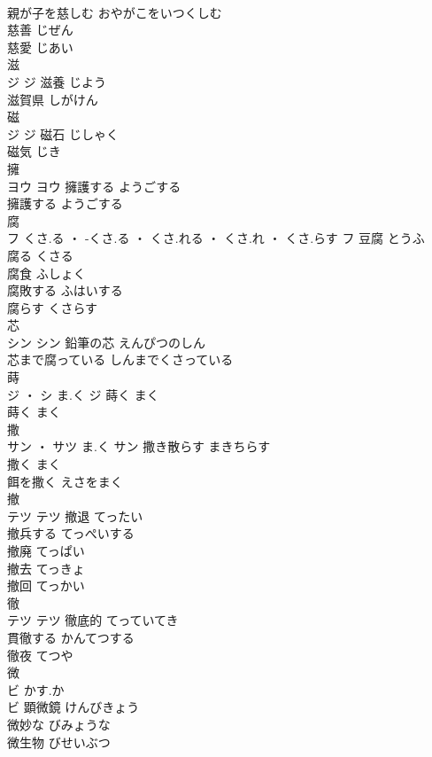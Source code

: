 \documentclass[8pt]{extreport}
\begin{document}
\begin{CJK}{UTF8}{min}
\\	親が子を慈しむ	おやがこをいつくしむ	
\\	慈善	じぜん	
\\	慈愛	じあい	
\\	滋	
\\	ジ		ジ	滋養	じよう	
\\	滋賀県	しがけん	
\\	磁	
\\	ジ		ジ	磁石	じしゃく	
\\	磁気	じき	
\\	擁	
\\	ヨウ		ヨウ	擁護する	ようごする	
\\	擁護する	ようごする	
\\	腐	
\\	フ	くさ.る ・ -くさ.る ・ くさ.れる ・ くさ.れ ・ くさ.らす	フ	豆腐	とうふ	
\\	腐る	くさる	
\\	腐食	ふしょく	
\\	腐敗する	ふはいする	
\\	腐らす	くさらす	
\\	芯	
\\	シン		シン	鉛筆の芯	えんぴつのしん	
\\	芯まで腐っている	しんまでくさっている	
\\	蒔	
\\	ジ ・ シ	ま.く	ジ	蒔く	まく	
\\	蒔く	まく	
\\	撒	
\\	サン ・ サツ	ま.く	サン	撒き散らす	まきちらす	
\\	撒く	まく	
\\	餌を撒く	えさをまく	
\\	撤	
\\	テツ		テツ	撤退	てったい	
\\	撤兵する	てっぺいする	
\\	撤廃	てっぱい	
\\	撤去	てっきょ	
\\	撤回	てっかい	
\\	徹	
\\	テツ		テツ	徹底的	てっていてき	
\\	貫徹する	かんてつする	
\\	徹夜	てつや	
\\	微	
\\	ビ	かす.か
\\	ビ	顕微鏡	けんびきょう	
\\	微妙な	びみょうな	
\\	微生物	びせいぶつ	

\end{CJK}
\end{document}
